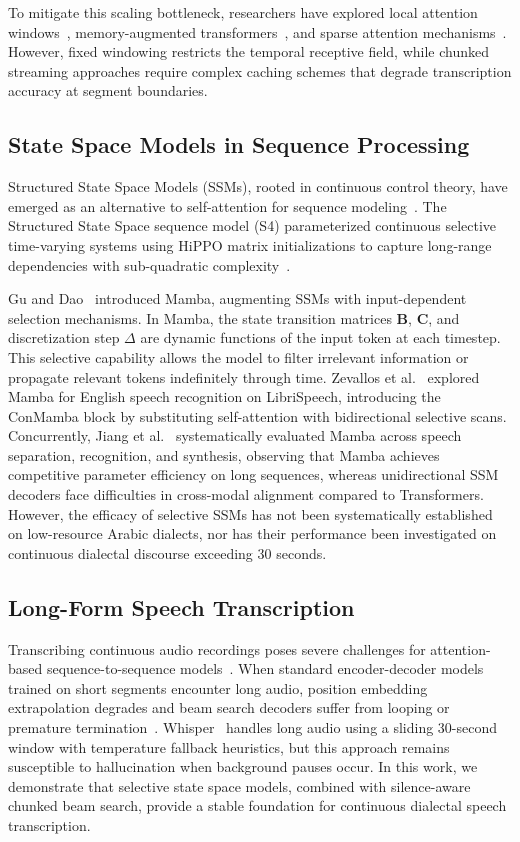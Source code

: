 \documentclass[journal]{IEEEtran}
\begin{document}
To mitigate this scaling bottleneck, researchers have explored local attention windows~\cite{zhang2020streaming}, memory-augmented transformers~\cite{shi2021emformer}, and sparse attention mechanisms~\cite{dao2022flashattention}. However, fixed windowing restricts the temporal receptive field, while chunked streaming approaches require complex caching schemes that degrade transcription accuracy at segment boundaries.

\subsection{State Space Models in Sequence Processing}
Structured State Space Models (SSMs), rooted in continuous control theory, have emerged as an alternative to self-attention for sequence modeling~\cite{gu2023mamba}. The Structured State Space sequence model (S4) parameterized continuous selective time-varying systems using HiPPO matrix initializations to capture long-range dependencies with sub-quadratic complexity~\cite{fu2023hungry,dao2024transformers}.

Gu and Dao~\cite{gu2023mamba} introduced Mamba, augmenting SSMs with input-dependent selection mechanisms. In Mamba, the state transition matrices $\mathbf{B}$, $\mathbf{C}$, and discretization step $\Delta$ are dynamic functions of the input token at each timestep. This selective capability allows the model to filter irrelevant information or propagate relevant tokens indefinitely through time. Zevallos et al.~\cite{zevallos2025mamba} explored Mamba for English speech recognition on LibriSpeech, introducing the ConMamba block by substituting self-attention with bidirectional selective scans. Concurrently, Jiang et al.~\cite{jiang2024speechslytherin} systematically evaluated Mamba across speech separation, recognition, and synthesis, observing that Mamba achieves competitive parameter efficiency on long sequences, whereas unidirectional SSM decoders face difficulties in cross-modal alignment compared to Transformers. However, the efficacy of selective SSMs has not been systematically established on low-resource Arabic dialects, nor has their performance been investigated on continuous dialectal discourse exceeding 30 seconds.

\subsection{Long-Form Speech Transcription}
Transcribing continuous audio recordings poses severe challenges for attention-based sequence-to-sequence models~\cite{radford2023whisper,chiu2018sota}. When standard encoder-decoder models trained on short segments encounter long audio, position embedding extrapolation degrades and beam search decoders suffer from looping or premature termination~\cite{luscher2019rwth}. Whisper~\cite{radford2023whisper} handles long audio using a sliding 30-second window with temperature fallback heuristics, but this approach remains susceptible to hallucination when background pauses occur. In this work, we demonstrate that selective state space models, combined with silence-aware chunked beam search, provide a stable foundation for continuous dialectal speech transcription.
\end{document}
